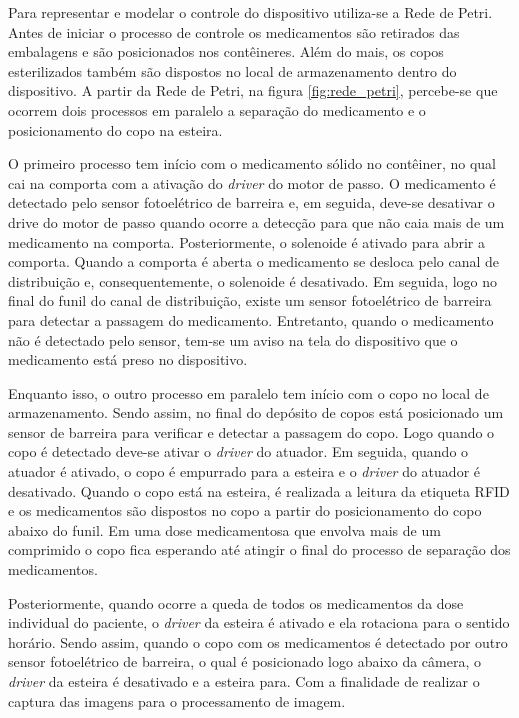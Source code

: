 Para representar e modelar o controle do dispositivo utiliza-se a Rede de Petri. Antes de iniciar o processo de controle os medicamentos são retirados das embalagens e são posicionados nos contêineres. Além do mais, os copos esterilizados também são dispostos no local de armazenamento dentro do dispositivo. A partir da Rede de Petri, na figura \ref{fig:rede_petri},  percebe-se que ocorrem dois processos em paralelo a separação do medicamento e o posicionamento do copo na esteira. 

O primeiro processo tem início com o medicamento sólido no contêiner, no qual cai na comporta com a ativação do \textit{driver} do motor de passo. O medicamento é detectado pelo sensor fotoelétrico de barreira e, em seguida, deve-se desativar o drive do motor de passo quando ocorre a detecção para que não caia mais de um medicamento na comporta. Posteriormente, o solenoide é ativado para abrir a comporta. Quando a comporta é aberta o medicamento se desloca pelo canal de distribuição e, consequentemente, o solenoide é desativado. Em seguida, logo no final do funil do canal de distribuição, existe um sensor fotoelétrico de barreira para detectar a passagem do medicamento. Entretanto, quando o medicamento não é detectado pelo sensor, tem-se um aviso na tela do dispositivo que o medicamento está preso no dispositivo.

Enquanto isso, o outro processo em paralelo tem início com o copo no local de armazenamento. Sendo assim, no final do depósito de copos está posicionado um sensor de barreira para verificar e detectar a passagem do copo. Logo quando o copo é detectado deve-se ativar o \textit{driver} do atuador. Em seguida, quando o atuador é ativado, o copo é empurrado para a esteira e o \textit{driver} do atuador é desativado. Quando o copo está na esteira, é realizada a leitura da etiqueta RFID e os medicamentos são dispostos no copo a partir do posicionamento do copo abaixo do funil. Em uma dose medicamentosa que envolva mais de um comprimido o copo fica esperando até atingir o final do processo de separação dos medicamentos.

Posteriormente, quando ocorre a queda de todos os medicamentos da dose individual do paciente, o \textit{driver} da esteira é ativado e ela rotaciona para o sentido horário. Sendo assim, quando o copo com os medicamentos é detectado por outro sensor fotoelétrico de barreira, o qual é posicionado logo abaixo da câmera, o \textit{driver} da esteira é desativado e a esteira para. Com a finalidade de realizar o captura das imagens para o processamento de imagem. 

